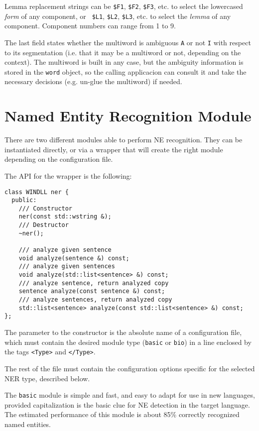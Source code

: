 \documentclass[a4paper]{book}
\begin{document}
 Lemma replacement strings can be {\tt \$F1}, {\tt \$F2}, {\tt \$F3},
 etc. to select the lowercased {\sl form} of any component, or {\tt
   \$L1}, {\tt \$L2}, {\tt \$L3}, etc. to select the {\sl lemma} of
 any component. Component numbers can range from 1 to 9.

 The last field states whether the multiword is ambiguous {\tt A} or
 not {\tt I} with respect to its segmentation (i.e. that it may be a
 multiword or not, depending on the context). The multiword is built
in any case, but the ambiguity information is stored in the {\tt word}
object, so the calling applicacion can consult it and take the necessary
decisions (e.g. un-glue the multiword) if needed.

\section{Named Entity Recognition Module}
\label{file-ner}

  There are two different modules able to perform NE recognition. 
  They can be instantiated directly, or via a wrapper that will create
  the right module depending on the configuration file.

  The API for the wrapper is the following:
\begin{verbatim}
class WINDLL ner {
  public:
    /// Constructor
    ner(const std::wstring &);
    /// Destructor
    ~ner();

    /// analyze given sentence
    void analyze(sentence &) const;
    /// analyze given sentences
    void analyze(std::list<sentence> &) const;
    /// analyze sentence, return analyzed copy
    sentence analyze(const sentence &) const;
    /// analyze sentences, return analyzed copy
    std::list<sentence> analyze(const std::list<sentence> &) const;
};
\end{verbatim}

  The parameter to the constructor is the absolute name of a
  configuration file, which must contain the desired module type
  (\verb#basic# or \verb#bio#) in a line enclosed by the tags
  \verb#<Type># and \verb#</Type>#.

  The rest of the file must contain the configuration options specific
  for the selected NER type, described below.

  The {\tt basic} module is simple and fast, and easy to adapt for use
  in new languages, provided capitalization is the basic clue for NE
  detection in the target language. The estimated performance of this
  module is about 85\% correctly recognized named entities.
\end{document}
